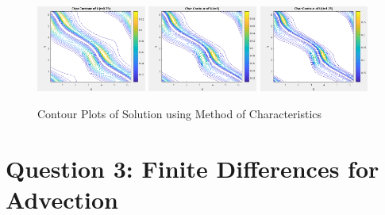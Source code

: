 \documentclass{article}
\begin{document}
\begin{enumerate}[label=\alph*)]
\begin{figure}
            \includegraphics[width=0.32\textwidth]{t75charcontour.png}
            \includegraphics[width=0.32\textwidth]{t1charcontour.png}
            \includegraphics[width=0.32\textwidth]{t125charcontour.png}
        \emp
        \caption{Contour Plots of Solution using Method of Characteristics}
    \end{figure}

\end{enumerate}

\section*{Question 3: Finite Differences for Advection}
\end{document}
